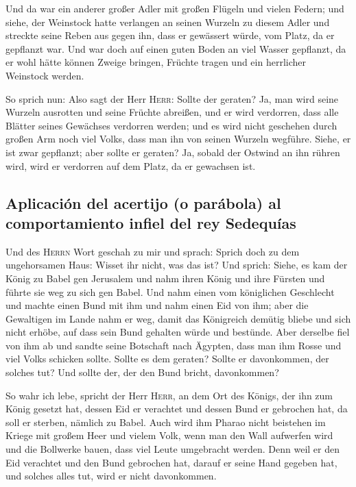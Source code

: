  Und da war ein anderer großer Adler mit großen Flügeln
und vielen Federn; und siehe, der Weinstock hatte verlangen an seinen
Wurzeln zu diesem Adler und streckte seine Reben aus gegen ihn, dass er
gewässert würde, vom Platz, da er gepflanzt war.  Und war
doch auf einen guten Boden an viel Wasser gepflanzt, da er wohl hätte
können Zweige bringen, Früchte tragen und ein herrlicher Weinstock
werden.

 So sprich nun: Also sagt der Herr \textsc{Herr}: Sollte
der geraten? Ja, man wird seine Wurzeln ausrotten und seine Früchte
abreißen, und er wird verdorren, dass alle Blätter seines Gewächses
verdorren werden; und es wird nicht geschehen durch großen Arm noch viel
Volks, dass man ihn von seinen Wurzeln wegführe.  Siehe,
er ist zwar gepflanzt; aber sollte er geraten? Ja, sobald der Ostwind an
ihn rühren wird, wird er verdorren auf dem Platz, da er gewachsen ist.

\hypertarget{aplicaciuxf3n-del-acertijo-o-paruxe1bola-al-comportamiento-infiel-del-rey-sedequuxedas}{%
\subsection{Aplicación del acertijo (o parábola) al comportamiento
infiel del rey
Sedequías}\label{aplicaciuxf3n-del-acertijo-o-paruxe1bola-al-comportamiento-infiel-del-rey-sedequuxedas}}

 Und des \textsc{Herrn} Wort geschah zu mir und sprach:
 Sprich doch zu dem ungehorsamen Haus: Wisset ihr nicht,
was das ist? Und sprich: Siehe, es kam der König zu Babel gen Jerusalem
und nahm ihren König und ihre Fürsten und führte sie weg zu sich gen
Babel.  Und nahm einen vom königlichen Geschlecht und
machte einen Bund mit ihm und nahm einen Eid von ihm; aber die
Gewaltigen im Lande nahm er weg,  damit das Königreich
demütig bliebe und sich nicht erhöbe, auf dass sein Bund gehalten würde
und bestünde.  Aber derselbe fiel von ihm ab und sandte
seine Botschaft nach Ägypten, dass man ihm Rosse und viel Volks schicken
sollte. Sollte es dem geraten? Sollte er davonkommen, der solches tut?
Und sollte der, der den Bund bricht, davonkommen?

 So wahr ich lebe, spricht der Herr \textsc{Herr}, an dem
Ort des Königs, der ihn zum König gesetzt hat, dessen Eid er verachtet
und dessen Bund er gebrochen hat, da soll er sterben, nämlich zu Babel.
 Auch wird ihm Pharao nicht beistehen im Kriege mit
großem Heer und vielem Volk, wenn man den Wall aufwerfen wird und die
Bollwerke bauen, dass viel Leute umgebracht werden.  Denn
weil er den Eid verachtet und den Bund gebrochen hat, darauf er seine
Hand gegeben hat, und solches alles tut, wird er nicht davonkommen.

